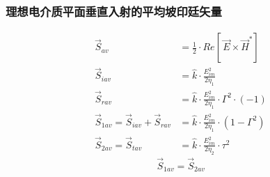\documentclass[a4paper]{report}
\begin{document}
\subsubsection{理想电介质平面垂直入射的平均坡印廷矢量}
\begin{align*}
    \vec{S}_{av}&=\frac{1}{2}\cdot Re[\,\vec{E}\times \vec{H}^*]\\
    \vec{S}_{iav}&=\hat{k}\cdot\frac{E_{im}^2}{2\eta_1}\\
    \vec{S}_{rav}&=\hat{k}\cdot\frac{E_{im}^2}{2\eta_1}\cdot\Gamma^2\cdot(-1)\\
    \vec{S}_{1av}=\vec{S}_{iav}+\vec{S}_{rav}&=\hat{k}\cdot\frac{E_{im}^2}{2\eta_1}\cdot(1-\Gamma^2)\\
    \vec{S}_{2av}=\vec{S}_{tav}&=\hat{k}\cdot\frac{E_{im}^2}{2\eta_2}\cdot\tau^2
\end{align*}
$$\vec{S}_{1av}=\vec{S}_{2av}$$
\end{document}
